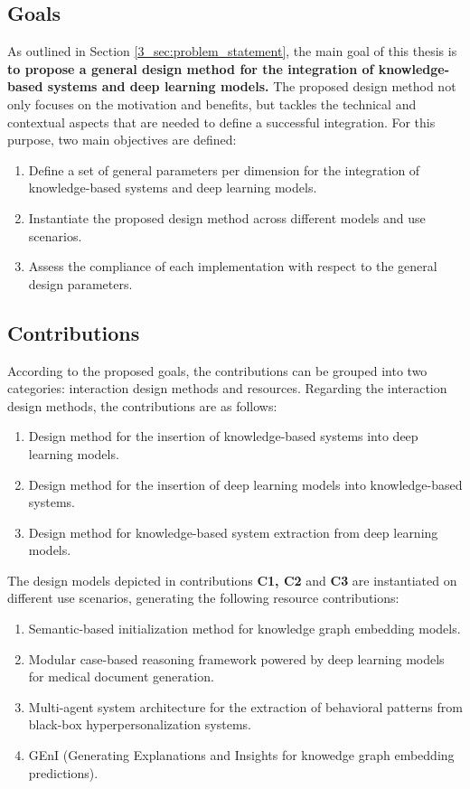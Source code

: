 \subsection{Goals}
As outlined in Section \ref{3_sec:problem_statement}, the main goal of this thesis is \textbf{to propose a general design method for the integration of knowledge-based systems and deep learning models.}  The proposed design method not only focuses on the motivation and benefits, but tackles the technical and contextual aspects that are needed to define a successful integration. For this purpose, two main objectives are defined:
\begin{enumerate}[start=1,label={\bfseries O\arabic*:}]
    \item Define a set of general parameters per dimension for the integration of knowledge-based systems and deep learning models.
    \item Instantiate the proposed design method across different models and use scenarios.
    \item Assess the compliance of each implementation with respect to the general design parameters. 
\end{enumerate}

\subsection{Contributions}
According to the proposed goals, the contributions can be grouped into two categories: interaction design methods and resources.
Regarding the interaction design methods, the contributions are as follows:
\begin{enumerate}[start=1,label={\bfseries C\arabic*:}]
    \item Design method for the insertion of knowledge-based systems into deep learning models.
    \item Design method for the insertion of deep learning models into knowledge-based systems.
    \item Design method for knowledge-based system extraction from deep learning models.
\end{enumerate}
The design models depicted in contributions \textbf{C1, C2} and \textbf{C3} are instantiated on different use scenarios, generating the following resource contributions:
\begin{enumerate}[start=4,label={\bfseries C\arabic*:}]
    \item Semantic-based initialization method for knowledge graph embedding models.
    \item Modular case-based reasoning framework powered by deep learning models for medical document generation.
    \item Multi-agent system architecture for the extraction of behavioral patterns from black-box hyperpersonalization systems.
    \item GEnI (Generating Explanations and Insights for knowedge graph embedding predictions).
\end{enumerate}


